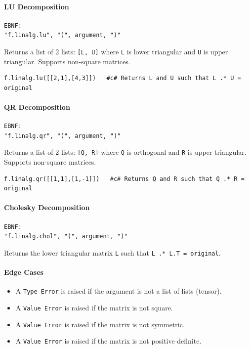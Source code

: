 \paragraph{LU Decomposition}
\begin{verbatim}
EBNF:
"f.linalg.lu", "(", argument, ")"
\end{verbatim}
Returns a list of 2 lists: \texttt{[L, U]} where \texttt{L} is lower triangular and \texttt{U} is upper triangular. Supports non-square matrices.
\begin{verbatim}
f.linalg.lu([[2,1],[4,3]])   #c# Returns L and U such that L .* U = original
\end{verbatim}

\paragraph{QR Decomposition}
\begin{verbatim}
EBNF:
"f.linalg.qr", "(", argument, ")"
\end{verbatim}
Returns a list of 2 lists: \texttt{[Q, R]} where \texttt{Q} is orthogonal and \texttt{R} is upper triangular. Supports non-square matrices.
\begin{verbatim}
f.linalg.qr([[1,1],[1,-1]])   #c# Returns Q and R such that Q .* R = original
\end{verbatim}

\paragraph{Cholesky Decomposition}
\begin{verbatim}
EBNF:
"f.linalg.chol", "(", argument, ")"
\end{verbatim}
Returns the lower triangular matrix \texttt{L} such that \texttt{L .* L.T = original}. \\

\paragraph{Edge Cases}
\begin{itemize}
\item A \texttt{Type Error} is raised if the argument is not a list of lists (tensor).
\item A \texttt{Value Error} is raised if the matrix is not square.
\item A \texttt{Value Error} is raised if the matrix is not symmetric.
\item A \texttt{Value Error} is raised if the matrix is not positive definite.
\end{itemize}

